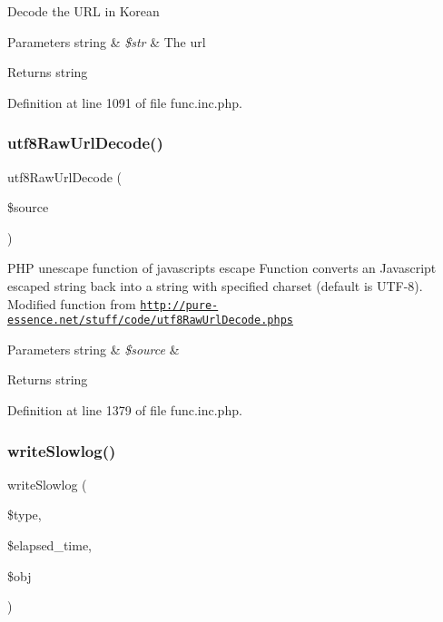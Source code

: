 Decode the U\+RL in Korean


\begin{DoxyParams}[1]{Parameters}
string & {\em \$str} & The url \\
\hline
\end{DoxyParams}
\begin{DoxyReturn}{Returns}
string 
\end{DoxyReturn}


Definition at line 1091 of file func.\+inc.\+php.

\hypertarget{func_8inc_8php_af1649820887f052ce1f1c9ca623f2db3}{}\label{func_8inc_8php_af1649820887f052ce1f1c9ca623f2db3} 
\subsubsection{\texorpdfstring{utf8\+Raw\+Url\+Decode()}{utf8RawUrlDecode()}}
{\footnotesize\ttfamily utf8\+Raw\+Url\+Decode (\begin{DoxyParamCaption}\item[{}]{\$source }\end{DoxyParamCaption})}

P\+HP unescape function of javascript\textquotesingle{}s escape Function converts an Javascript escaped string back into a string with specified charset (default is U\+T\+F-\/8). Modified function from \href{http://pure-essence.net/stuff/code/utf8RawUrlDecode.phps}{\tt http\+://pure-\/essence.\+net/stuff/code/utf8\+Raw\+Url\+Decode.\+phps}


\begin{DoxyParams}[1]{Parameters}
string & {\em \$source} & \\
\hline
\end{DoxyParams}
\begin{DoxyReturn}{Returns}
string 
\end{DoxyReturn}


Definition at line 1379 of file func.\+inc.\+php.

\hypertarget{func_8inc_8php_ad04b6facc446291dbbb292553250a4a6}{}\label{func_8inc_8php_ad04b6facc446291dbbb292553250a4a6} 
\subsubsection{\texorpdfstring{write\+Slowlog()}{writeSlowlog()}}
{\footnotesize\ttfamily write\+Slowlog (\begin{DoxyParamCaption}\item[{}]{\$type,  }\item[{}]{\$elapsed\+\_\+time,  }\item[{}]{\$obj }\end{DoxyParamCaption})}


